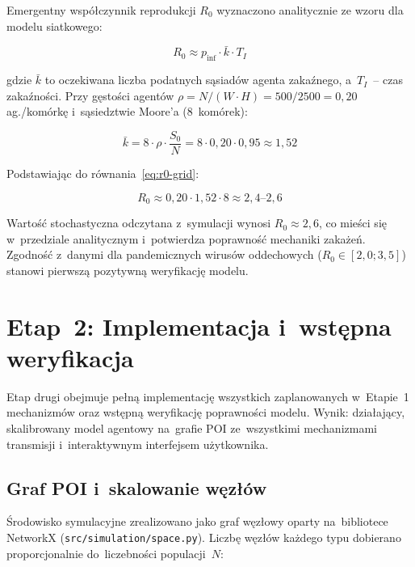 \documentclass[polish]{projectreport}
\begin{document}
Emergentny współczynnik reprodukcji $R_0$ wyznaczono analitycznie ze wzoru
dla modelu siatkowego:

\begin{equation}
  R_0 \approx p_{\text{inf}} \cdot \bar{k} \cdot T_I
  \label{eq:r0-grid}
\end{equation}

\noindent gdzie $\bar{k}$ to oczekiwana liczba podatnych sąsiadów agenta
zakaźnego, a~$T_I$~-- czas zakaźności. Przy gęstości agentów
$\rho = N / (W \cdot H) = 500/2500 = 0{,}20$ ag./komórkę i~sąsiedztwie
Moore'a (8~komórek):

\begin{equation}
  \bar{k} = 8 \cdot \rho \cdot \frac{S_0}{N} = 8 \cdot 0{,}20 \cdot 0{,}95 \approx 1{,}52
  \label{eq:k-bar}
\end{equation}

\noindent Podstawiając do równania~\eqref{eq:r0-grid}:

\begin{equation}
  R_0 \approx 0{,}20 \cdot 1{,}52 \cdot 8 \approx 2{,}4\text{--}2{,}6
  \label{eq:r0-result}
\end{equation}

\noindent Wartość stochastyczna odczytana z~symulacji wynosi $R_0 \approx 2{,}6$,
co mieści się w~przedziale analitycznym i~potwierdza poprawność mechaniki
zakażeń. Zgodność z~danymi dla pandemicznych wirusów oddechowych
($R_0 \in [2{,}0;3{,}5]$) stanowi pierwszą pozytywną weryfikację modelu.

\section{Etap~2: Implementacja i~wstępna weryfikacja}
\label{sec:stage2}

Etap drugi obejmuje pełną implementację wszystkich zaplanowanych w~Etapie~1
mechanizmów oraz wstępną weryfikację poprawności modelu.
Wynik: działający, skalibrowany model agentowy na~grafie POI ze~wszystkimi
mechanizmami transmisji i~interaktywnym interfejsem użytkownika.

\subsection{Graf POI i~skalowanie węzłów}
\label{sec:poi-graph}

Środowisko symulacyjne zrealizowano jako graf węzłowy oparty na~bibliotece
NetworkX (\texttt{src/simulation/space.py}). Liczbę węzłów każdego typu
dobierano proporcjonalnie do~liczebności populacji~$N$:
\end{document}
